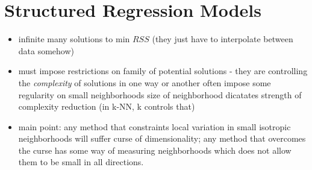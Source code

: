 \documentclass[a4paper]{report}
\newcommand{\<}{\textless}
\renewcommand{\>}{\textgreater}
\begin{document}
\section{Structured Regression Models}
\begin{itemize}
  \item infinite many solutions to min $RSS$ (they just have to interpolate between data somehow)
  \item must impose restrictions on family of potential solutions - they are controlling the \emph{complexity} of solutions in one way or another
    \subitem often impose some regularity on small neighborhoods
    \subitem size of neighborhood dicatates strength of complexity reduction (in k-NN, k controls that)
  \item main point: any method that constraints local variation in small isotropic neighborhoods will suffer curse of dimensionality; any method that overcomes the curse has some way of measuring neighborhoods which does not allow them to be small in all directions.
\end{itemize}
\end{document}
